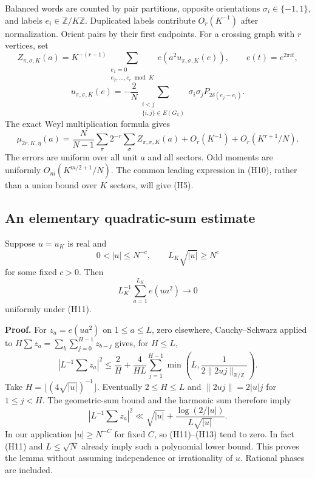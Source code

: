 Balanced words are counted by pair partitions, opposite orientations
\(\sigma_i\in\{-1,1\}\), and labels \(e_i\in\mathbb Z/K\mathbb Z\).
Duplicated labels contribute \(O_r(K^{-1})\) after normalization.
Orient pairs by their first endpoints. For a crossing graph with \(r\)
vertices, set
\[
 Z_{\pi,\sigma,K}(a)=K^{-(r-1)}
 \sum_{\substack{e_1=0\\e_2,\ldots,e_r\bmod K}}
       e\!\left(a^2 u_{\pi,\sigma,K}(e)\right),\qquad e(t)=e^{2\pi it},
\]
\[
 u_{\pi,\sigma,K}(e)=
 -\frac2N\sum_{\substack{i<j\\\{i,j\}\in E(G_\pi)}}
       \sigma_i\sigma_j P_{2\delta(e_j-e_i)}.                    \tag{H9}
\]
The exact Weyl multiplication formula gives
\[
 \mu_{2r,K,\eta}(a)
 =\frac{N}{N-1}\sum_{\pi}2^{-r}\sum_\sigma Z_{\pi,\sigma,K}(a)
       +O_r(K^{-1})+O_r(K^{r+1}/N).                            \tag{H10}
\]
The errors are uniform over all unit \(a\) and all sectors. Odd moments
are uniformly \(O_m(K^{m/2+1}/N)\). The common leading expression in
(H10), rather than a union bound over \(K\) sectors, will give (H5).

\hypertarget{pell-harmonic-an-elementary-quadratic-sum-estimate}{%
\subsection{An elementary quadratic-sum estimate}\label{pell-harmonic-an-elementary-quadratic-sum-estimate}}

\begin{lemma}\label{pass1:pell_harmonic_transition-2} Suppose \(u=u_K\) is real and
\[
 0<|u|\le N^{-c},\qquad L_K\sqrt{|u|}\ge N^c                 \tag{H11}
\]
for some fixed \(c>0\). Then
\[
 L_K^{-1}\sum_{a=1}^{L_K}e(ua^2)\longrightarrow0
\]
uniformly under (H11).
\end{lemma}

\textbf{Proof.} For \(z_a=e(ua^2)\) on \(1\le a\le L\), zero elsewhere, Cauchy--Schwarz
applied to \(H\sum z_a=\sum_b\sum_{j=0}^{H-1}z_{b-j}\) gives, for \(H\le L\),
\[
 \left|L^{-1}\sum z_a\right|^2
 \le\frac2H+\frac4{HL}\sum_{j=1}^{H-1}
                   \min\!\left(L,\frac1{2\|2uj\|_{\mathbb R/\mathbb Z}}\right).
                                                               \tag{H12}
\]
Take \(H=\lfloor(4\sqrt{|u|})^{-1}\rfloor\). Eventually \(2\le H\le L\) and
\(\|2uj\|=2|u|j\) for \(1\le j<H\). The geometric-sum bound and the harmonic
sum therefore imply
\[
 \left|L^{-1}\sum z_a\right|^2
 \ll \sqrt{|u|}+
      \frac{\log(2/|u|)}{L\sqrt{|u|}}.                         \tag{H13}
\]
In our application \(|u|\ge N^{-C}\) for fixed \(C\), so (H11)--(H13) tend
to zero. In fact (H11) and \(L\le\sqrt N\) already imply such a polynomial
lower bound. This proves the lemma without assuming independence or
irrationality of \(u\). Rational phases are included.


